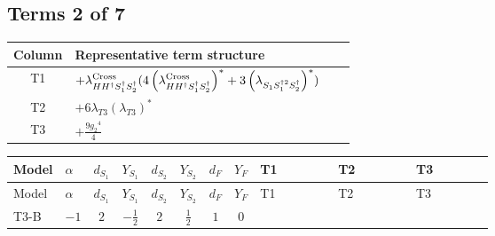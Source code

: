 \documentclass[8pt]{article}
\begin{document}
\begin{landscape}
\subsection*{Terms 2 of 7}
\begin{center}
\begin{tabular}{@{}c >{\raggedright\arraybackslash}p{0.82\linewidth}@{}}
\toprule
Column & Representative term structure \\
\midrule
T1 & \(\displaystyle +{\lambda_{H H^\dagger S_1^\dagger S_2^\dagger}^{\rm Cross}} (4 \left({\lambda_{H H^\dagger S_1^\dagger S_2^\dagger}^{\rm Cross}}\right)^{*}+3 \left({\lambda_{S_1 S_1^{\dagger 2}S_2^\dagger}}\right)^{*})\) \\
\midrule
T2 & \(\displaystyle +6 {\lambda_{T3}} \left({\lambda_{T3}}\right)^{*}\) \\
\midrule
T3 & \(\displaystyle +\frac{9 {g_2}^4}{4}\) \\
\midrule
\bottomrule
\end{tabular}
\end{center}
\smallskip
\tiny
\begin{longtable}{@{}llcccccc >{\raggedright\arraybackslash}p{0.21\linewidth} >{\raggedright\arraybackslash}p{0.21\linewidth} >{\raggedright\arraybackslash}p{0.21\linewidth}@{}}
\toprule
Model & $\alpha$ & $d_{S_1}$ & $Y_{S_1}$ & $d_{S_2}$ & $Y_{S_2}$ & $d_F$ & $Y_F$ & T1 & T2 & T3 \\
\midrule
\endfirsthead
\toprule
Model & $\alpha$ & $d_{S_1}$ & $Y_{S_1}$ & $d_{S_2}$ & $Y_{S_2}$ & $d_F$ & $Y_F$ & T1 & T2 & T3 \\
\midrule
\endhead
T3-B & $-1$ & $2$ & $-\frac{1}{2}$ & $2$ & $\frac{1}{2}$ & $1$ & $0$ & \scriptsize\adjustbox{max width=\linewidth}{$\begin{gathered} +{\lambda_{H H^\dagger S_1^\dagger S_2^\dagger}^{\rm Cross}} (4 \left({\lambda_{H H^\dagger S_1^\dagger S_2^\dagger}^{\rm Cross}}\right)^{*}+3 \left({\lambda_{S_1 S_1^{\dagger 2}S_2^\dagger}}\right)^{*})\end{gathered}$} & \scriptsize\adjustbox{max width=\linewidth}{$\begin{gathered} +6 {\lambda_{T3}} \left({\lambda_{T3}}\right)^{*}\end{gathered}$} & \scriptsize\adjustbox{max width=\linewidth}{$\begin{gathered} +\frac{9 {g_2}^4}{4}\end{gathered}$} \\
\midrule

\end{longtable}
\end{landscape}
\end{document}
